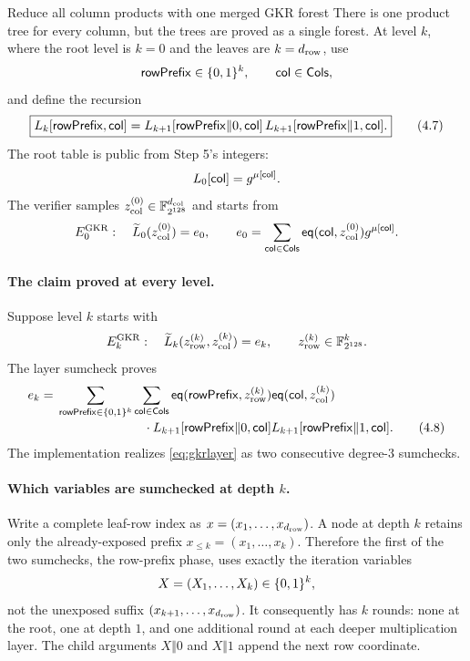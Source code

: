 \begin{step}{Reduce all column products with one merged GKR forest}{%
}\label{step:gkr}
There is one product tree for every column, but the trees are proved as a
single forest.  At level $k$, where the root level is $k=0$ and the leaves are
$k=d_{\mathrm{row}}$, use
\[
  \mathsf{rowPrefix}\in\{0,1\}^k,\qquad \mathsf{col}\in\mathsf{Cols},
\]
and define the recursion
\[
  \boxed{
  L_k[\mathsf{rowPrefix},\mathsf{col}]
  =L_{k+1}[\mathsf{rowPrefix}\Vert0,\mathsf{col}]\,
   L_{k+1}[\mathsf{rowPrefix}\Vert1,\mathsf{col}].}            \tag{4.7}
\]
The root table is public from Step 5's integers:
\[
  L_0[\mathsf{col}]=g^{\mu[\mathsf{col}]}.
\]
The verifier samples $z_{\mathrm{col}}^{(0)}\in\mathbb{F}_{2^{128}}^{d_{\mathrm{col}}}$ and starts from
\[
  E_0^{\mathrm{GKR}}:\quad
  \widetilde L_0(z_{\mathrm{col}}^{(0)})=e_0,
  \qquad
  e_0=\sum_{\mathsf{col}\in\mathsf{Cols}}
       \mathsf{eq}(\mathsf{col},z_{\mathrm{col}}^{(0)})g^{\mu[\mathsf{col}]}.
\]

\paragraph{The claim proved at every level.}
Suppose level $k$ starts with
\[
  E_k^{\mathrm{GKR}}:\quad
  \widetilde L_k(z_{\mathrm{row}}^{(k)},z_{\mathrm{col}}^{(k)})=e_k,
  \qquad z_{\mathrm{row}}^{(k)}\in\mathbb{F}_{2^{128}}^k.
\]
The layer sumcheck proves
\begin{align}
  e_k
  ={}&\sum_{\mathsf{rowPrefix}\in\{0,1\}^k}
      \sum_{\mathsf{col}\in\mathsf{Cols}}
      \mathsf{eq}(\mathsf{rowPrefix},z_{\mathrm{row}}^{(k)})
      \mathsf{eq}(\mathsf{col},z_{\mathrm{col}}^{(k)})                         \notag\\[-2pt]
     &\hspace{2.4cm}\cdot
      L_{k+1}[\mathsf{rowPrefix}\Vert0,\mathsf{col}]
      L_{k+1}[\mathsf{rowPrefix}\Vert1,\mathsf{col}].              \tag{4.8}\label{eq:gkrlayer}
\end{align}
The implementation realizes \eqref{eq:gkrlayer} as two consecutive
degree-$3$ sumchecks.

\paragraph{Which variables are sumchecked at depth $k$.}
Write a complete leaf-row index as
$x=(x_1,\ldots,x_{d_{\mathrm{row}}})$.  A node at depth $k$ retains only the
already-exposed prefix $x_{\leq k}=(x_1,\ldots,x_k)$.  Therefore the first of
the two sumchecks, the row-prefix phase, uses exactly the iteration variables
\[
  X=(X_1,\ldots,X_k)\in\{0,1\}^k,
\]
not the unexposed suffix $(x_{k+1},\ldots,x_{d_{\mathrm{row}}})$.  It consequently has
$k$ rounds: none at the root, one at depth $1$, and one additional round at
each deeper multiplication layer.  The child arguments $X\Vert0$ and
$X\Vert1$ append the next row coordinate.


\end{step}
